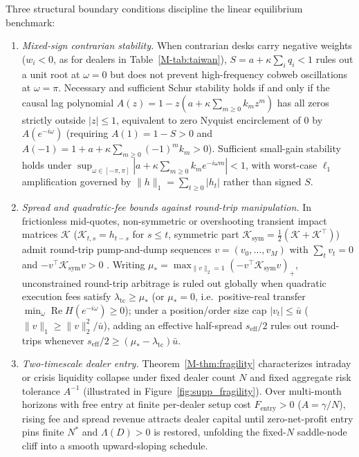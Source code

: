 \documentclass[12pt]{article}
\theoremstyle{definition}
\theoremstyle{remark}
\begin{document}
Three structural boundary conditions discipline the linear equilibrium benchmark:
\begin{enumerate}
  \item[(i)] \emph{Mixed-sign contrarian stability.} When contrarian desks carry negative weights ($w_i < 0$, as for dealers in Table~\ref{M-tab:taiwan}), $S = a + \kappa \sum_i q_i < 1$ rules out a unit root at $\omega = 0$ but does not prevent high-frequency cobweb oscillations at $\omega = \pi$. Necessary and sufficient Schur stability holds if and only if the causal lag polynomial $A(z) = 1 - z(a + \kappa \sum_{m \ge 0} k_m z^m)$ has all zeros strictly outside $|z| \le 1$, equivalent to zero Nyquist encirclement of $0$ by $A(e^{-i\omega})$ (requiring $A(1) = 1 - S > 0$ and $A(-1) = 1 + a + \kappa\sum_{m\ge 0} (-1)^m k_m > 0$). Sufficient small-gain stability holds under $\sup_{\omega \in [-\pi, \pi]} |a + \kappa \sum_{m \ge 0} k_m e^{-i\omega m}| < 1$, with worst-case $\ell_1$ amplification governed by $\|h\|_1 = \sum_{t \ge 0} |h_t|$ rather than signed $S$.
  \item[(ii)] \emph{Spread and quadratic-fee bounds against round-trip manipulation.} In frictionless mid-quotes, non-symmetric or overshooting transient impact matrices $\mathcal{K}$ ($\mathcal{K}_{t,s} = h_{t-s}$ for $s \le t$, symmetric part $\mathcal{K}_{\mathrm{sym}} = \tfrac{1}{2}(\mathcal{K} + \mathcal{K}^\top)$) admit round-trip pump-and-dump sequences $v = (v_0, \dots, v_M)$ with $\sum_t v_t = 0$ and $-v^\top \mathcal{K}_{\mathrm{sym}} v > 0$ \citep{huberman2004}. Writing $\mu_* = \max_{\|v\|_2 = 1} (-v^\top \mathcal{K}_{\mathrm{sym}} v)_+$, unconstrained round-trip arbitrage is ruled out globally when quadratic execution fees satisfy $\lambda_{\mathrm{tc}} \ge \mu_*$ (or $\mu_* = 0$, i.e.\ positive-real transfer $\min_\omega \operatorname{Re} H(e^{-i\omega}) \ge 0$); under a position/order size cap $|v_t| \le \bar{u}$ ($\|v\|_1 \ge \|v\|_2^2/\bar{u}$), adding an effective half-spread $s_{\mathrm{eff}}/2$ rules out round-trips whenever $s_{\mathrm{eff}}/2 \ge (\mu_* - \lambda_{\mathrm{tc}})\bar{u}$.
  \item[(iii)] \emph{Two-timescale dealer entry.} Theorem~\ref{M-thm:fragility} characterizes intraday or crisis liquidity collapse under fixed dealer count $N$ and fixed aggregate risk tolerance $A^{-1}$ (illustrated in Figure~\ref{fig:supp_fragility}). Over multi-month horizons with free entry at finite per-dealer setup cost $F_{\mathrm{entry}} > 0$ ($A = \gamma / N$), rising fee and spread revenue attracts dealer capital until zero-net-profit entry pins finite $N^*$ and $\Lambda(D) > 0$ is restored, unfolding the fixed-$N$ saddle-node cliff into a smooth upward-sloping schedule.
\end{enumerate}
\end{document}
